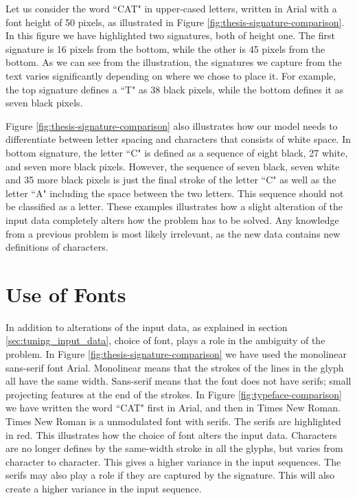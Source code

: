 Let us consider the word ``CAT" in upper-cased letters, written in Arial with a font height of 50 pixels, as illustrated in Figure \ref{fig:thesis-signature-comparison}. In this figure we have highlighted two signatures, both of height one. The first signature is 16 pixels from the bottom, while the other is 45 pixels from the bottom. As we can see from the illustration, the signatures we capture from the text varies significantly depending on where we chose to place it. For example, the top signature defines a ``T" as 38 black pixels, while the bottom defines it as seven black pixels.

Figure \ref{fig:thesis-signature-comparison} also illustrates how our model needs to differentiate between letter spacing and characters that consists of white space. In bottom signature, the letter ``C" is defined as a sequence of eight black, 27 white, and seven more black pixels. However, the sequence of seven black, seven white and 35 more black pixels is just the final stroke of the letter ``C" as well as the letter ``A" including the space between the two letters. This sequence should not be classified as a letter. These examples illustrates how a slight alteration of the input data completely alters how the problem has to be solved. Any knowledge from a previous problem is most likely irrelevant, as the new data contains new definitions of characters.

\section{Use of Fonts}
In addition to alterations of the input data, as explained in section \ref{sec:tuning_input_data}, choice of font, plays a role in the ambiguity of the problem. In Figure \ref{fig:thesis-signature-comparison} we have used the monolinear sans-serif font Arial. Monolinear means that the strokes of the lines in the glyph all have the same width. Sans-serif means that the font does not have serifs; small projecting features at the end of the strokes. In Figure \ref{fig:typeface-comparison} we have written the word ``CAT" first in Arial, and then in Times New Roman. Times New Roman is a unmodulated font with serifs. The serifs are highlighted in red. This illustrates how the choice of font alters the input data. Characters are no longer defines by the same-width stroke in all the glyphs, but varies from character to character. This gives a higher variance in the input sequences. The serifs may also play a role if they are captured by the signature. This will also create a higher variance in the input sequence.


